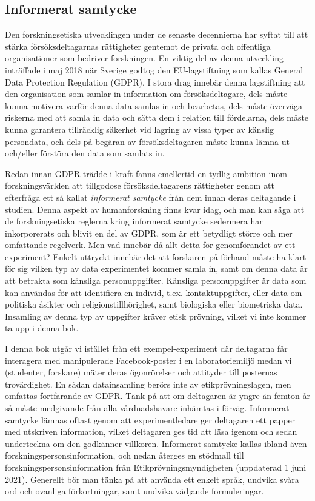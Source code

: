 \documentclass[
]{book}
\begin{document}
\hypertarget{sub07.6.2}{%
\subsection{Informerat samtycke}\label{sub07.6.2}}

Den forskningsetiska utvecklingen under de senaste decennierna har syftat till att stärka försöksdeltagarnas rättigheter gentemot de privata och offentliga organisationer som bedriver forskningen. En viktig del av denna utveckling inträffade i maj 2018 när Sverige godtog den EU-lagstiftning som kallas General Data Protection Regulation (GDPR). I stora drag innebär denna lagstiftning att den organisation som samlar in information om försöksdeltagare, dels måste kunna motivera varför denna data samlas in och bearbetas, dels måste överväga riskerna med att samla in data och sätta dem i relation till fördelarna, dels måste kunna garantera tillräcklig säkerhet vid lagring av vissa typer av känslig persondata, och dels på begäran av försöksdeltagaren måste kunna lämna ut och/eller förstöra den data som samlats in.

Redan innan GDPR trädde i kraft fanns emellertid en tydlig ambition inom forskningsvärlden att tillgodose försöksdeltagarens rättigheter genom att efterfråga ett så kallat \emph{informerat samtycke} från dem innan deras deltagande i studien. Denna aspekt av humanforskning finns kvar idag, och man kan säga att de forskningsetiska reglerna kring informerat samtycke sedermera har inkorporerats och blivit en del av GDPR, som är ett betydligt större och mer omfattande regelverk. Men vad innebär då allt detta för genomförandet av ett experiment? Enkelt uttryckt innebär det att forskaren på förhand måste ha klart för sig vilken typ av data experimentet kommer samla in, samt om denna data är att betrakta som känsliga personuppgifter. Känsliga personuppgifter är data som kan användas för att identifiera en individ, t.ex. kontaktuppgifter, eller data om politiska åsikter och religionstillhörighet, samt biologiska eller biometriska data. Insamling av denna typ av uppgifter kräver etisk prövning, vilket vi inte kommer ta upp i denna bok.

I denna bok utgår vi istället från ett exempel-experiment där deltagarna får interagera med manipulerade Facebook-poster i en laboratoriemiljö medan vi (studenter, forskare) mäter deras ögonrörelser och attityder till posternas trovärdighet. En sådan datainsamling berörs inte av etikprövningslagen, men omfattas fortfarande av GDPR. Tänk på att om deltagaren är yngre än femton år så måste medgivande från alla vårdnadshavare inhämtas i förväg. Informerat samtycke lämnas oftast genom att experimentledare ger deltagaren ett papper med utskriven information, vilket deltagaren ges tid att läsa igenom och sedan underteckna om den godkänner villkoren. Informerat samtycke kallas ibland även forskningspersonsinformation, och nedan återges en stödmall till forskningspersonsinformation från Etikprövningsmyndigheten (uppdaterad 1 juni 2021). Generellt bör man tänka på att använda ett enkelt språk, undvika svåra ord och ovanliga förkortningar, samt undvika vädjande formuleringar.
\end{document}
